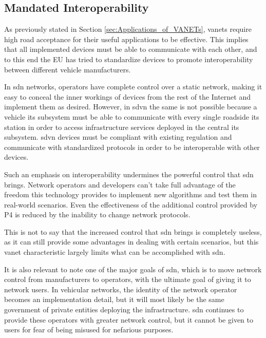 \subsection{Mandated Interoperability}

As previously stated in Section \ref{sec:Applications_of_VANETs}, \glspl{vanet} require high road acceptance for their useful applications to be effective. This implies that all implemented devices must be able to communicate with each other, and to this end the EU has tried to standardize devices to promote interoperability between different vehicle manufacturers.

In \gls{sdn} networks, operators have complete control over a static network, making it easy to conceal the inner workings of devices from the rest of the Internet and implement them as desired. However, in \gls{sdvn} the same is not possible because a vehicle \gls{its} subsystem must be able to communicate with every single roadside \gls{its} station in order to access infrastructure services deployed in the central \gls{its} subsystem. \gls{sdvn} devices must be compliant with existing regulation and communicate with standardized protocols in order to be interoperable with other devices.

Such an emphasis on interoperability undermines the powerful control that \gls{sdn} brings. Network operators and developers can't take full advantage of the freedom this technology provides to implement new algorithms and test them in real-world scenarios. Even the effectiveness of the additional control provided by P4 is reduced by the inability to change network protocols.

This is not to say that the increased control that \gls{sdn} brings is completely useless, as it can still provide some advantages in dealing with certain scenarios, but this \gls{vanet} characteristic largely limits what can be accomplished with \gls{sdn}. 

It is also relevant to note one of the major goals of \gls{sdn}, which is to move network control from manufacturers to operators, with the ultimate goal of giving it to network users. In vehicular networks, the identity of the network operator becomes an implementation detail, but it will most likely be the same government of private entities deploying the infrastructure. \gls{sdn} continues to provide these operators with greater network control, but it cannot be given to users for fear of being misused for nefarious purposes.

